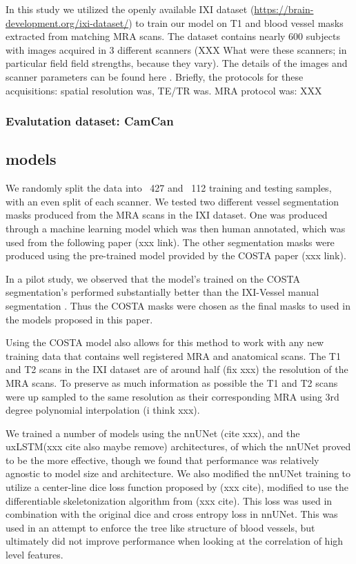 \documentclass[pdflatex,sn-mathphys-num]{sn-jnl}
\begin{document}
In this study we utilized the openly available IXI dataset (\url{https://brain-development.org/ixi-dataset/}) to train our model on T1 and blood vessel masks extracted from matching MRA scans. The dataset contains nearly 600 subjects with images acquired in 3 different scanners (XXX What were these scanners; in particular field field strengths, because they vary). The details of the images and scanner parameters can be found here . Briefly, the protocols for these acquisitions: spatial resolution was, TE/TR was. MRA protocol was: XXX

\subsubsection{Evalutation dataset: CamCan}

\subsection{models}

We randomly split the data into ~427 and ~112 training and testing samples, with an even split of each scanner. We tested two different vessel segmentation masks produced from the MRA scans in the IXI dataset. One was produced through a machine learning model which was then human annotated, which was used from the following paper (xxx link). The other segmentation masks were produced using the pre-trained model provided by the COSTA paper (xxx link).

In a pilot study, we observed that the model's trained on the COSTA segmentation's performed substantially better than the IXI-Vessel manual segmentation \cite{XXX}. Thus the COSTA masks were chosen as the final masks to used in the models proposed in this paper.

Using the COSTA model also allows for this method to work with any new training data that contains well registered MRA and anatomical scans. The T1 and T2 scans in the IXI dataset are of around half (fix xxx) the resolution of the MRA scans. To preserve as much information as possible the T1 and T2 scans were up sampled to the same resolution as their corresponding MRA using 3rd degree polynomial interpolation (i think xxx).


We trained a number of models using the nnUNet (cite xxx), and the uxLSTM(xxx cite also maybe remove) architectures, of which the nnUNet proved to be the more effective, though we found that performance was relatively agnostic to model size and architecture. We also modified the nnUNet training to utilize a center-line dice loss function proposed by (xxx cite), modified to use the differentiable skeletonization algorithm from (xxx cite). This loss was used in combination with the original dice and cross entropy loss in nnUNet. This was used in an attempt to enforce the tree like structure of blood vessels, but ultimately did not improve performance when looking at the correlation of high level features.
\end{document}
